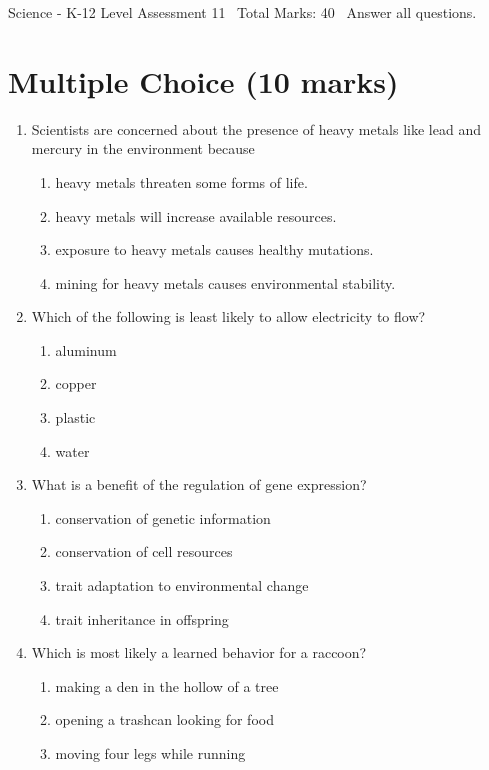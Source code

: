 \documentclass[12pt]{article}
\begin{document}
\begin{center}
Science - K-12 Level Assessment 11 \
Total Marks: 40 \
Answer all questions.
\end{center}

\section*{Multiple Choice (10 marks)}
\begin{enumerate}[label=\arabic*.]
\item Scientists are concerned about the presence of heavy metals like lead and mercury in the environment because
\begin{enumerate}[label=(\alph*)]
    \item heavy metals threaten some forms of life.
    \item heavy metals will increase available resources.
    \item exposure to heavy metals causes healthy mutations.
    \item mining for heavy metals causes environmental stability.
\end{enumerate}
\item Which of the following is least likely to allow electricity to flow?
\begin{enumerate}[label=(\alph*)]
    \item aluminum
    \item copper
    \item plastic
    \item water
\end{enumerate}
\item What is a benefit of the regulation of gene expression?
\begin{enumerate}[label=(\alph*)]
    \item conservation of genetic information
    \item conservation of cell resources
    \item trait adaptation to environmental change
    \item trait inheritance in offspring
\end{enumerate}
\item Which is most likely a learned behavior for a raccoon?
\begin{enumerate}[label=(\alph*)]
    \item making a den in the hollow of a tree
    \item opening a trashcan looking for food
    \item moving four legs while running

\end{enumerate}
\end{enumerate}
\end{document}
